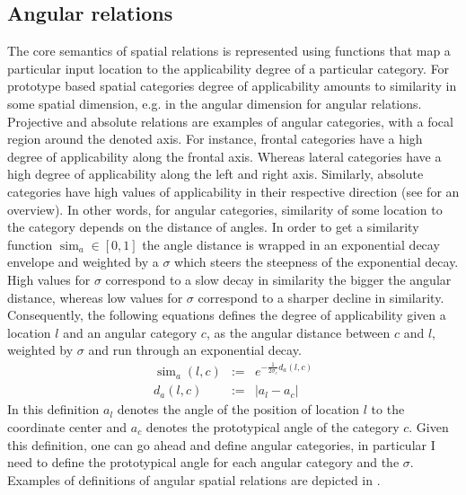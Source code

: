 \subsection{Angular relations} 
The core semantics of spatial relations is represented
using functions that map a particular input location to the applicability degree 
of a particular category. For prototype based spatial categories 
degree of applicability amounts to similarity in some spatial dimension, 
e.g. in the angular dimension for angular relations. 
Projective and absolute relations are
examples of angular categories, with a focal region around the 
denoted axis. For instance, frontal categories have a high degree of applicability
along the frontal axis. Whereas lateral categories have a high 
degree of applicability along the left and right axis. Similarly, 
absolute categories have high values of applicability
in their respective direction (see  
for an overview). In other words, for angular categories, 
similarity of some location to the category depends on the distance
of angles. In order to get a similarity function $\operatorname{sim}_{a} \in [0,1]$
the angle distance is wrapped in an exponential decay envelope 
and weighted by a $\sigma$ which steers the steepness of the 
exponential decay. High values for $\sigma$ correspond to a slow decay 
in similarity the bigger the angular distance, whereas low values for $\sigma$ 
correspond to a sharper decline in similarity.
Consequently, the following equations defines the degree of applicability given a
location $l$ and an angular category $c$, as the angular distance 
between $c$ and $l$, weighted by $\sigma$ and run through an exponential
decay.
\begin{eqnarray}
\label{e:angular-category-similarity}
\operatorname{sim}_{a}(l,c)&:=&e^{-\frac{1}{2 \sigma_c} d_a(l,c)}\\
\label{e:angular-distance}
d_a(l,c)&:=&|a_l - a_c|
\end{eqnarray}
In this definition $a_l$ denotes the angle of the position of location $l$ 
to the coordinate center and $a_c$ denotes the prototypical angle of the 
category $c$. Given this definition, one can go ahead and define 
angular categories, in particular I need to define the prototypical
angle for each angular category and the $\sigma$. 
Examples of definitions of angular spatial relations are 
depicted in . 


